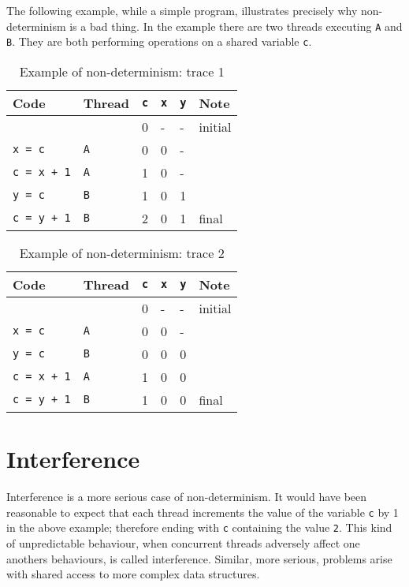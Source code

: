 The following example, while a simple program, illustrates precisely why non-determinism is a bad thing. In the example there are two threads executing \verb|A| and \verb|B|. They are both performing operations on a shared variable \verb|c|.
\begin{table}[H]
    \centering
    {\RaggedRight
    \begin{tabular}{p{} C{0.1\textwidth} C{0.1\textwidth} C{0.1\textwidth} C{0.1\textwidth} p{0.2\textwidth}}
    \textbf{Code} & \textbf{Thread} & \verb|c| & \verb|x| & \verb|y| & \textbf{Note}\\
    \hline
    \hline
     &  & 0 & - & - & initial\\
    \hline
    \verb|x = c| & \verb|A| & 0 & 0 & - & \\
    \hline
    \verb|c = x + 1| & \verb|A| & 1 & 0 & - & \\
    \hline
    \verb|y = c| & \verb|B| & 1 & 0 & 1 & \\
    \hline
    \verb|c = y + 1| & \verb|B| & 2 & 0 & 1 & final\\
    \hline
    \end{tabular}
    }
    \caption{Example of non-determinism: trace 1}
\end{table}
\begin{table}[H]
    \centering
    {\RaggedRight
    \begin{tabular}{p{} C{0.1\textwidth} C{0.1\textwidth} C{0.1\textwidth} C{0.1\textwidth} p{0.2\textwidth}}
    \textbf{Code} & \textbf{Thread} & \verb|c| & \verb|x| & \verb|y| & \textbf{Note}\\
    \hline
    \hline
     &  & 0 & - & - & initial\\
    \hline
    \verb|x = c| & \verb|A| & 0 & 0 & - & \\
    \hline
    \verb|y = c| & \verb|B| & 0 & 0 & 0 & \\
    \hline
    \verb|c = x + 1| & \verb|A| & 1 & 0 & 0 & \\
    \hline
    \verb|c = y + 1| & \verb|B| & 1 & 0 & 0 & final\\
    \hline
    \end{tabular}
    }
    \caption{Example of non-determinism: trace 2}
\end{table}

\section{Interference}
Interference is a more serious case of non-determinism. It would have been reasonable to expect that each thread increments the value of the variable \verb|c| by 1 in the above example; therefore ending with \verb|c| containing the value \verb|2|. This kind of unpredictable behaviour, when concurrent threads adversely affect one anothers behaviours, is called interference. Similar, more serious, problems arise with shared access to more complex data structures.

